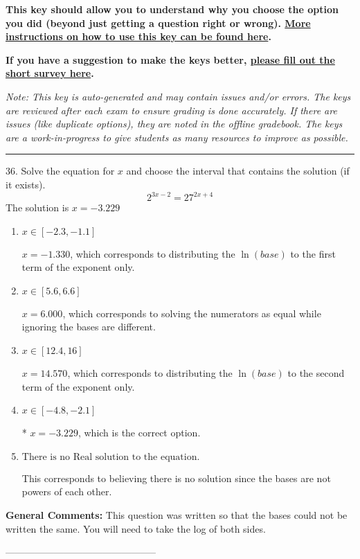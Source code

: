 \documentclass{article}[14pt]
\begin{document}
\textbf{This key should allow you to understand why you choose the option you did (beyond just getting a question right or wrong). \href{https://xronos.clas.ufl.edu/mac1105spring2020/courseDescriptionAndMisc/Exams/LearningFromResults}{More instructions on how to use this key can be found here}.}

\textbf{If you have a suggestion to make the keys better, \href{https://forms.gle/CZkbZmPbC9XALEE88}{please fill out the short survey here}.}

\textit{Note: This key is auto-generated and may contain issues and/or errors. The keys are reviewed after each exam to ensure grading is done accurately. If there are issues (like duplicate options), they are noted in the offline gradebook. The keys are a work-in-progress to give students as many resources to improve as possible.}

\rule{\textwidth}{0.4pt}

36. Solve the equation for $x$ and choose the interval that contains the solution (if it exists).
$$ 2^{3x-2} = 27^{2x+4} $$ 
The solution is $ x = -3.229 $ 

\begin{enumerate}[label=\Alph*.] 
\item $ x \in [-2.3, -1.1] $ 

 $x = -1.330$, which corresponds to distributing the $\ln(base)$ to the first term of the exponent only. 
\item $ x \in [5.6, 6.6] $ 

 $x = 6.000$, which corresponds to solving the numerators as equal while ignoring the bases are different. 
\item $ x \in [12.4, 16] $ 

 $x = 14.570$, which corresponds to distributing the $\ln(base)$ to the second term of the exponent only. 
\item $ x \in [-4.8, -2.1] $ 

 * $x = -3.229$, which is the correct option. 
\item $ \text{There is no Real solution to the equation.} $ 

 This corresponds to believing there is no solution since the bases are not powers of each other. 
\end{enumerate} 
 
\textbf{General Comments:} This question was written so that the bases could not be written the same. You will need to take the log of both sides.

-----------------------------------------------
\end{document}
